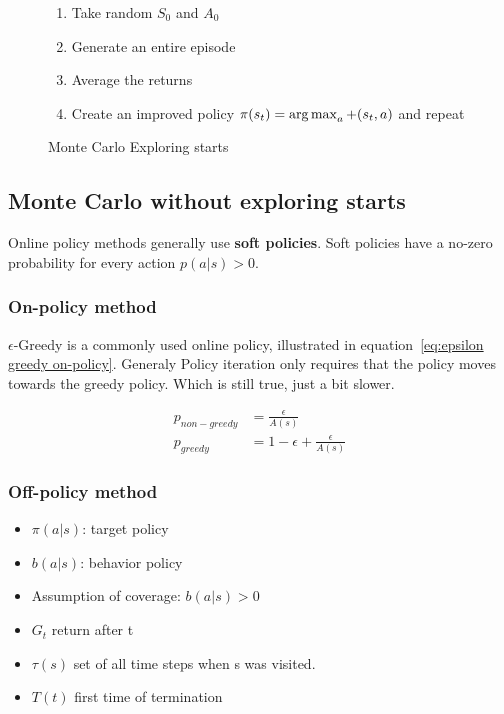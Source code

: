 \begin{figure}[H]
	\begin{enumerate}
		\item Take random $S_0$ and $A_0$
		\item Generate an entire episode
		\item Average the returns
		\item Create an improved policy $\pi(s_t) = \operatorname*{arg\,max}_a +(s_t, a)$ and repeat
	\end{enumerate}
\label{fig:monte carlo exploring starts}
\caption{Monte Carlo Exploring starts}
\end{figure}

\subsection{Monte Carlo without exploring starts}
Online policy methods generally use \textbf{soft policies}. Soft policies have a no-zero probability for every action $p(a | s)>0$.

\subsubsection{On-policy method}

$\epsilon$-Greedy is a commonly used online policy, illustrated in equation~\ref{eq:epsilon greedy on-policy}. Generaly Policy iteration only requires that the policy moves towards the greedy policy. Which is still true, just a bit slower.

\begin{equation}
\begin{split}
p_{non-greedy} & = \frac{\epsilon}{A(s)} \\
p_{greedy}& = 1 - \epsilon + \frac{\epsilon}{A(s)}
\end{split}
\label{eq:epsilon greedy on-policy}
\end{equation}

\subsubsection{Off-policy method}

\begin{itemize}
	\item $\pi(a|s)$: target policy
	\item $b(a|s)$: behavior policy
	\item Assumption of coverage: $b(a|s)>0$
	\item $G_t$ return after t
	\item $\tau(s)$ set of all time steps when s was visited.
	\item $T(t)$ first time of termination
\end{itemize}

